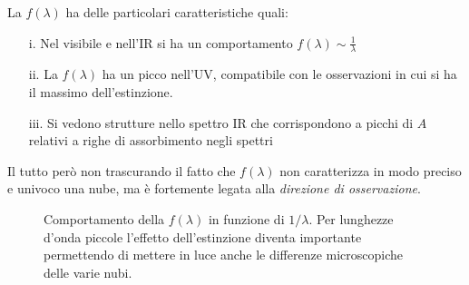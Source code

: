 La $f(\lambda)$ ha delle particolari caratteristiche quali:
\begin{itemize}
		\item[i.]   Nel visibile e nell'IR si ha un comportamento $f(\lambda) \sim \frac{1}{\lambda}$
		\item[ii.]  La $f(\lambda)$ ha un picco nell'UV, compatibile con le osservazioni in cui si ha il massimo dell'estinzione.
		\item[iii.] Si vedono strutture nello spettro IR che corrispondono a picchi di $A$ relativi a righe di assorbimento negli spettri
\end{itemize}
Il tutto per\`o non trascurando il fatto che $f(\lambda)$ non caratterizza in modo preciso e univoco una nube, ma \`e fortemente legata alla \emph{direzione di osservazione}.
\begin{figure}
		\centering
		\caption{Comportamento della $f(\lambda)$ in funzione di $1/\lambda$. Per lunghezze d'onda piccole l'effetto dell'estinzione diventa importante permettendo di mettere in luce anche le differenze microscopiche delle varie nubi.}
\end{figure}

